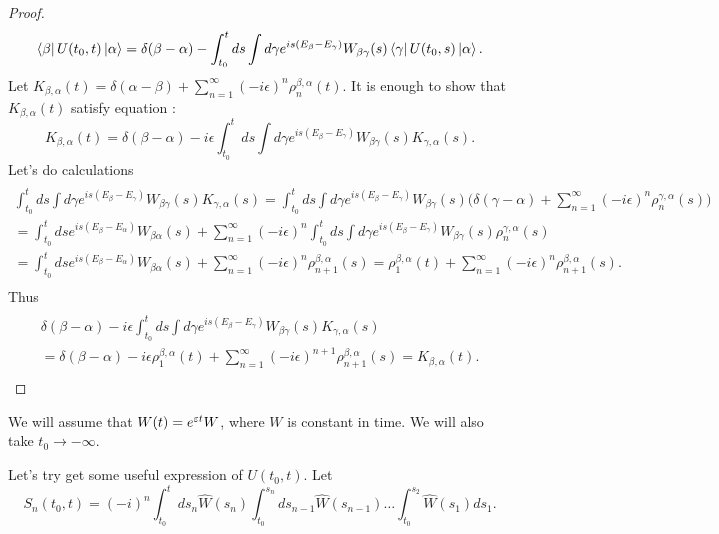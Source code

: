 \documentclass[main.tex]{subfiles}
\begin{document}
\begin{proof}
\begin{equation}
\bra{\beta} U(t_0, t) \ket{\alpha} = \delta(\beta - \alpha) - \int_{t_0}^t ds \int d\gamma e^{is(E_\beta - E_\gamma)} W_{\beta\gamma}(s) \bra{\gamma}U(t_0, s)\ket{\alpha}.
\end{equation}
Let $K_{\beta, \alpha}(t) = \delta(\alpha - \beta) + \sum_{n=1}^\infty (-i\epsilon)^n \rho^{\beta,\alpha}_n(t)$. It is enough to show that $K_{\beta, \alpha}(t)$ satisfy equation :
\begin{equation}
K_{\beta, \alpha}(t) = \delta(\beta - \alpha) - i\epsilon \int_{t_0}^t ds \int d\gamma e^{is(E_\beta - E_\gamma)} W_{\beta\gamma}(s) K_{\gamma, \alpha}(s).
\end{equation} 
Let's do calculations
\begin{multline*}
\\
\int_{t_0}^t ds \int d\gamma e^{is(E_\beta - E_\gamma)} W_{\beta\gamma}(s) K_{\gamma, \alpha}(s) = 
\int_{t_0}^t ds \int d\gamma e^{is(E_\beta - E_\gamma)} W_{\beta\gamma}(s) 
\bigg(\delta(\gamma - \alpha) + \sum_{n=1}^\infty (-i\epsilon)^n \rho^{\gamma,\alpha}_n(s)  \bigg) \\
= \int_{t_0}^t ds e^{is(E_\beta - E_\alpha)} W_{\beta\alpha}(s) + 
\sum_{n=1}^\infty (-i\epsilon)^n \int_{t_0}^t ds \int d\gamma e^{is(E_\beta - E_\gamma)} W_{\beta\gamma}(s) \rho^{\gamma,\alpha}_n(s)\\
=  \int_{t_0}^t ds e^{is(E_\beta - E_\alpha)} W_{\beta\alpha}(s) + \sum_{n=1}^\infty (-i\epsilon)^n \rho^{\beta,\alpha}_{n+1}(s) = \rho_1^{\beta,\alpha}(t) + \sum_{n=1}^\infty (-i\epsilon)^n \rho^{\beta,\alpha}_{n+1}(s).\\
\end{multline*}
Thus
\begin{multline*}\\
\delta(\beta - \alpha) - i\epsilon \int_{t_0}^t ds \int d\gamma e^{is(E_\beta - E_\gamma)} W_{\beta\gamma}(s) K_{\gamma, \alpha}(s) \\
= \delta(\beta - \alpha)-i\epsilon \rho_1^{\beta,\alpha}(t) + \sum_{n=1}^\infty (-i\epsilon)^{n + 1} \rho^{\beta,\alpha}_{n+1}(s) = K_{\beta, \alpha}(t).\\
\end{multline*}

\end{proof}

We will assume that $W(t) = e^{\eepsilon t} W$, where $W$ is constant in time. We will also take $t_0\to -\infty$. 

Let's try get some useful expression of $U(t_0, t)$.
Let
\begin{equation}
S_n(t_0, t) =  (-i)^n \int_{t_0}^t ds_n \hat{W}(s_n) \int_{t_0}^{s_n} ds_{n - 1} \hat{W}(s_{n-1})\dots \int_{t_0}^{s_2} \hat{W}(s_1)ds_1.
\end{equation}
\end{document}
